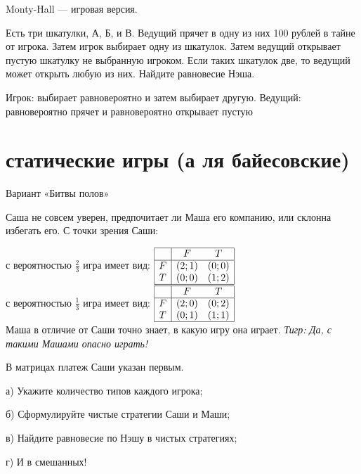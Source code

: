 \begin{problem}
Monty-Hall — игровая версия.

Есть три шкатулки, А, Б, и В. Ведущий прячет в одну из них 100 рублей в тайне от игрока. Затем игрок выбирает одну из шкатулок. Затем ведущий открывает пустую шкатулку не выбранную игроком. Если таких шкатулок две, то ведущий может открыть любую из них. Найдите равновесие Нэша.



\begin{sol}
Игрок: выбирает равновероятно и затем выбирает другую. Ведущий: равновероятно прячет и равновероятно открывает пустую
\end{sol}
\end{problem}





\section{статические игры (а ля байесовские)}


\begin{problem}
 Вариант «Битвы полов»

Саша не совсем уверен, предпочитает ли Маша его компанию, или склонна избегать его. С точки зрения Саши:

с вероятностью  $\frac{2}{3} $  игра имеет вид:  $\begin{array}{|c|cc|}  \hline {} & {F} & {T} \\  \hline {F} & {\left(2;1\right)} & {\left(0;0\right)} \\ {T} & {\left(0;0\right)} & {\left(1;2\right)} \\  \hline  \end{array}$ \\
с вероятностью  $\frac{1}{3} $  игра имеет вид:  $\begin{array}{|c|cc|}  \hline {} & {F} & {T} \\  \hline {F} & {\left(2;0\right)} & {\left(0;2\right)} \\ {T} & {\left(0;1\right)} & {\left(1;1\right)} \\  \hline  \end{array}$ \\
Маша в отличие от Саши точно знает, в какую игру она играет.
{\it Тигр:  Да, с такими Машами опасно играть!}\par
В матрицах платеж Саши указан первым.\par
а)	Укажите количество типов каждого игрока;\par
б)	Сформулируйте чистые стратегии Саши и Маши;\par
в)	Найдите равновесие по Нэшу в чистых стратегиях;\par
г)	И в смешанных!\par



\begin{sol}

\end{sol}
\end{problem}



